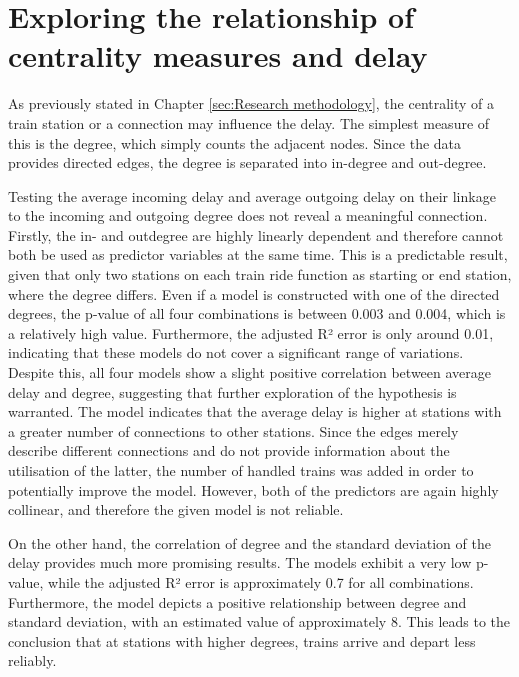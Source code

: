 \documentclass[12pt,a4paper]{article}
\newcounter{para}
\begin{document}
\maketitle
\section{\label{sec:RealtionshipCentrality}Exploring the relationship of centrality measures and delay}


As previously stated in Chapter \ref{sec:Research methodology}, the centrality of a train station or a connection may influence the delay. The simplest measure of this is the degree, which simply counts the adjacent nodes. Since the data provides directed edges, the degree is separated into in-degree and out-degree. 

Testing the average incoming delay and average outgoing delay on their linkage to the incoming and outgoing degree does not reveal a meaningful connection. Firstly, the in- and outdegree are highly linearly dependent and therefore cannot both be used as predictor variables at the same time. This is a predictable result, given that only two stations on each train ride function as starting or end station, where the degree differs. Even if a model is constructed with one of the directed degrees, the p-value of all four combinations is between 0.003 and 0.004, which is a relatively high value. Furthermore, the adjusted R² error is only around 0.01, indicating that these models do not cover a significant range of variations. Despite this, all four models show a slight positive correlation between average delay and degree, suggesting that further exploration of the hypothesis is warranted. The model indicates that the average delay is higher at stations with a greater number of connections to other stations. Since the edges merely describe different connections and do not provide information about the utilisation of the latter, the number of handled trains was added in order to potentially improve the model. However, both of the predictors are again highly collinear, and therefore the given model is not reliable.

On the other hand, the correlation of degree and the standard deviation of the delay provides much more promising results. The models exhibit a very low p-value, while the adjusted R² error is approximately 0.7 for all combinations. Furthermore, the model depicts a positive relationship between degree and standard deviation, with an estimated value of approximately 8. This leads to the conclusion that at stations with higher degrees, trains arrive and depart less reliably. 
\end{document}
